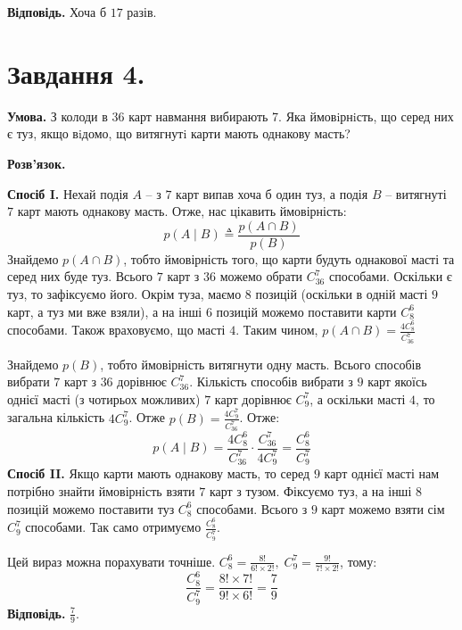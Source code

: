 \documentclass[12pt]{extarticle}
\begin{document}
\textbf{Відповідь.} Хоча б $17$ разів.
\pagebreak
\section*{Завдання 4.}

\textbf{Умова.} З колоди в 36 карт навмання вибирають 7. Яка ймовiрнiсть, що серед них є туз, якщо
вiдомо, що витягнутi карти мають однакову масть?

\textbf{Розв'язок.} 

\textbf{Спосіб I.} Нехай подія $A$ -- з $7$ карт випав хоча б один туз, а подія $B$ -- витягнуті $7$ карт мають однакову масть. Отже, нас цікавить ймовірність:
\[
p(A \mid B) \triangleq \frac{p(A \cap B)}{p(B)}
\]
Знайдемо $p(A \cap B)$, тобто ймовірність того, що карти будуть однакової масті та серед них буде туз. Всього $7$ карт з $36$ можемо обрати $C_{36}^7$ способами. Оскільки є туз, то зафіксуємо його. Окрім туза, маємо $8$ позицій (оскільки в одній масті $9$ карт, а туз ми вже взяли), а на інші $6$ позицій можемо поставити карти $C_8^6$ способами. Також враховуємо, що масті $4$. Таким чином, $p(A\cap B) = \frac{4C_8^6}{C_{36}^7}$

Знайдемо $p(B)$, тобто ймовірність витягнути одну масть. Всього способів вибрати $7$ карт з $36$ дорівнює $C_{36}^7$. Кількість способів вибрати з $9$ карт якоїсь однієї масті (з чотирьох можливих) $7$ карт дорівнює $C_9^7$, а оскільки масті $4$, то загальна кількість $4C_9^7$. Отже $p(B) = \frac{4C_9^7}{C_{36}^7}$. Отже:
\[
p(A \mid B) = \frac{4C_8^6}{C_{36}^7} \cdot \frac{C_{36}^7}{4C_9^7} = \frac{C_8^6}{C_9^7}
\]
\textbf{Спосіб II.} Якщо карти мають однакову масть, то серед $9$ карт однієї масті нам потрібно знайти ймовірність взяти $7$ карт з тузом. Фіксуємо туз, а на інші $8$ позицій можемо поставити туз $C_8^6$ способами. Всього з $9$ карт можемо взяти сім $C_9^7$ способами. Так само отримуємо $\frac{C_8^6}{C_9^7}$. 

Цей вираз можна порахувати точніше. $C_8^6 = \frac{8!}{6!\times 2!}, \; C_9^7 = \frac{9!}{7!\times 2!}$, тому:
\[
\frac{C_8^6}{C_9^7} = \frac{8! \times 7!}{9!\times 6!} = \frac{7}{9}
\]
\textbf{Відповідь.} $\frac{7}{9}$.
\end{document}
